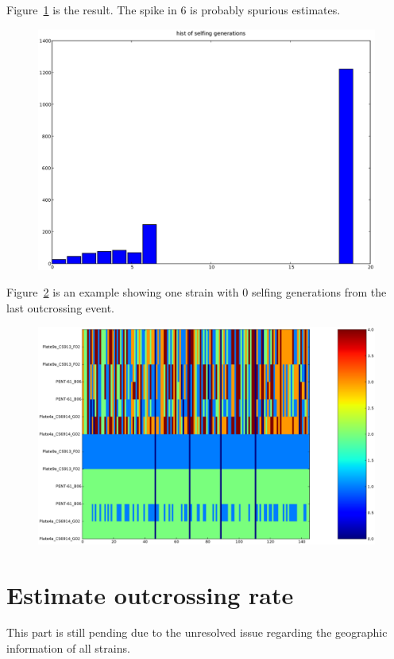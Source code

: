 \documentclass[a4paper,10pt]{article}
\begin{document}
Figure~\ref{f8} is the result. The spike in 6 is probably spurious estimates.

\begin{figure}
\includegraphics[width=1\textwidth]{figures/justin_data_y_b_filtered.estimate.selfing.generation.hist.eps}
\caption{}\label{f8}
\end{figure}

Figure~\ref{f9} is an example showing one strain with 0 selfing generations from the last outcrossing event.

\begin{figure}
\includegraphics[width=1\textwidth]{figures/trio1.eps}
\caption{}\label{f9}
\end{figure}

\section{Estimate outcrossing rate}
This part is still pending due to the unresolved issue regarding the geographic information of all strains.
\end{document}
